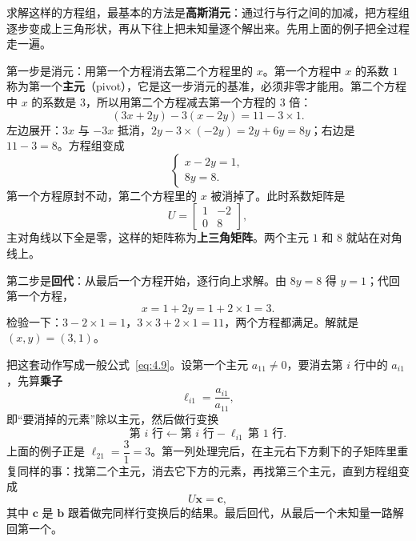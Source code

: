 \documentclass[UTF8,a4paper,12pt]{ctexart}
\numberwithin{equation}{section}
\begin{document}
	求解这样的方程组，最基本的方法是\textbf{高斯消元}：通过行与行之间的加减，把方程组逐步变成上三角形状，再从下往上把未知量逐个解出来。先用上面的例子把全过程走一遍。
	
	第一步是消元：用第一个方程消去第二个方程里的 $x$。第一个方程中 $x$ 的系数 $1$ 称为第一个\textbf{主元}（pivot），它是这一步消元的基准，必须非零才能用。第二个方程中 $x$ 的系数是 $3$，所以用第二个方程减去第一个方程的 $3$ 倍：
	\begin{equation}\label{eq:4.5}
	(3x+2y)-3(x-2y)=11-3\times 1.
	\end{equation}
	左边展开：$3x$ 与 $-3x$ 抵消，$2y-3\times(-2y)=2y+6y=8y$；右边是 $11-3=8$。方程组变成
	\begin{equation}\label{eq:4.6}
	\begin{cases}
		x-2y=1,\\
		8y=8.
	\end{cases}
	\end{equation}
	第一个方程原封不动，第二个方程里的 $x$ 被消掉了。此时系数矩阵是
	\begin{equation}\label{eq:4.7}
	U=
	\begin{bmatrix}
		1&-2\\
		0&8
	\end{bmatrix},
	\end{equation}
	主对角线以下全是零，这样的矩阵称为\textbf{上三角矩阵}。两个主元 $1$ 和 $8$ 就站在对角线上。
	
	第二步是\textbf{回代}：从最后一个方程开始，逐行向上求解。由 $8y=8$ 得 $y=1$；代回第一个方程，
	\begin{equation}\label{eq:4.8}
	x=1+2y=1+2\times 1=3.
	\end{equation}
	检验一下：$3-2\times 1=1$，$3\times 3+2\times 1=11$，两个方程都满足。解就是 $(x,y)=(3,1)$。
	
把这套动作写成一般公式~\eqref{eq:4.9}。设第一个主元 $a_{11}\neq 0$，要消去第 $i$ 行中的 $a_{i1}$，先算\textbf{乘子}
	\begin{equation}\label{eq:4.9}
	\ell_{i1}=\frac{a_{i1}}{a_{11}},
	\end{equation}
	即“要消掉的元素”除以主元，然后做行变换
	\begin{equation}\label{eq:4.10}
	\text{第 }i\text{ 行}
	\leftarrow
	\text{第 }i\text{ 行}
	-
	\ell_{i1}\,\text{第 }1\text{ 行}.
	\end{equation}
	上面的例子正是 $\ell_{21}=\dfrac{3}{1}=3$。第一列处理完后，在主元右下方剩下的子矩阵里重复同样的事：找第二个主元，消去它下方的元素，再找第三个主元，直到方程组变成
	\begin{equation}\label{eq:4.11}
	U\bm{x}=\bm{c},
	\end{equation}
	其中 $\bm{c}$ 是 $\bm{b}$ 跟着做完同样行变换后的结果。最后回代，从最后一个未知量一路解回第一个。
	
\end{document}
